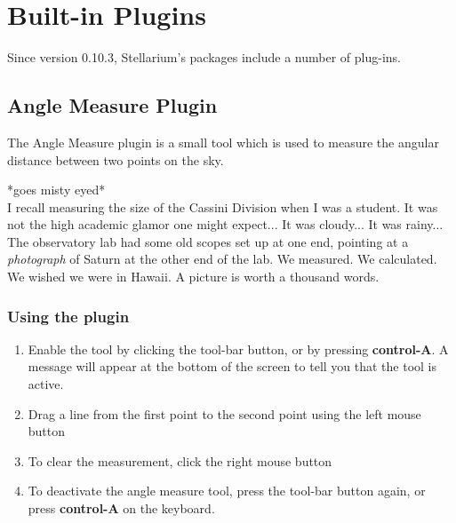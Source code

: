 
\chapter{Built-in Plugins}
Since version 0.10.3, Stellarium's packages include a number of plug-ins.

\section{Angle Measure Plugin}
\label{sec:plugins:AngleMeasure}


The Angle Measure plugin is a small tool which is used to measure the
angular distance between two points on the sky. 

\small{*goes misty eyed*\\ 
I recall measuring the size of the Cassini Division when I was a student.
It was not the high academic glamor one might expect... It was cloudy...
It was rainy... The observatory lab had some old scopes set up at one
end, pointing at a \emph{photograph} of Saturn at the other end of the
lab. We measured. We calculated. We wished we were in Hawaii. A picture
is worth a thousand words.}

\subsection{Using the plugin}
\label{sec:plugins:AngleMeasure:using}

\begin{enumerate}
\item
  Enable the tool by clicking the tool-bar button, or by pressing
  \textbf{control-A}. A message will appear at the bottom of the screen
  to tell you that the tool is active.
\item
  Drag a line from the first point to the second point using the left
  mouse button
\item
  To clear the measurement, click the right mouse button
\item
  To deactivate the angle measure tool, press the tool-bar button again,
  or press \textbf{control-A} on the keyboard.
\end{enumerate}

